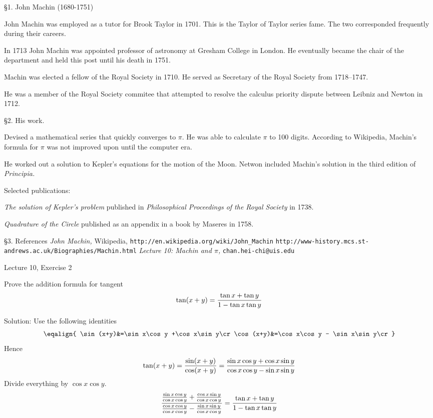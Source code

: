 \item{\S1.} John Machin (1680-1751)

 John Machin was employed as a tutor for Brook Taylor in 1701.
This is the Taylor of Taylor series fame.
The two corresponded frequently during their careers.

 In 1713 John Machin was appointed professor of astronomy at Gresham College
in London.
He eventually became the chair of the department and held this post until his death in 1751.

 Machin was elected a fellow of the Royal Society in 1710.
He served as Secretary of the Royal Society from 1718--1747.

 He was a member of the Royal Society commitee that
attempted to resolve the calculus priority dispute between Leibniz and Newton in 1712.

\item{\S2.} His work.

 Devised a mathematical series that quickly converges to $\pi$.
He was able to calculate $\pi$ to 100 digits.
According to Wikipedia, Machin's formula for $\pi$ was not improved upon
until the computer era.

 He worked out a solution to Kepler's equations for the motion of the Moon.
Netwon included Machin's solution in the third edition of {\it Principia.}

 Selected publications:

\itemitem{} {\it The solution of Kepler's problem} published in
{\it Philosophical Proceedings of the Royal Society} in 1738.

\itemitem{} {\it Quadrature of the Circle} published as an appendix
in a book by Maseres in 1758.

\item{\S3.} References
 {\it John Machin,} Wikipedia, {\tt http://en.wikipedia.org/wiki/John\_Machin}
 {\tt http://www-history.mcs.st-andrews.ac.uk/Biographies/Machin.html}
 {\it Lecture 10: Machin and $\pi$,} {\tt chan.hei-chi@uis.edu}

\beginsection Lecture 10, Exercise 2

Prove the addition formula for tangent
$$\tan(x+y)={\tan x + \tan y\over1-\tan x \tan y}$$

\bigskip
Solution: Use the following identities
$$\eqalign{
\sin(x+y)&=\sin x\cos y +\cos x\sin y\cr
\cos(x+y)&=\cos x\cos y - \sin x\sin y\cr
}$$
Hence
$$\tan(x+y)={\sin(x+y)\over\cos(x+y)}
={\sin x\cos y+\cos x\sin y\over\cos x\cos y-\sin x\sin y}
$$
Divide everything by $\cos x\cos y$.
$${
{\sin x\cos y\over\cos x\cos y}
+
{\cos x\sin y\over\cos x\cos y}
\over
{\cos x\cos y\over\cos x\cos y}
-
{\sin x\sin y\over\cos x\cos y}
}
=
{\tan x+\tan y\over1-\tan x\tan y}$$

